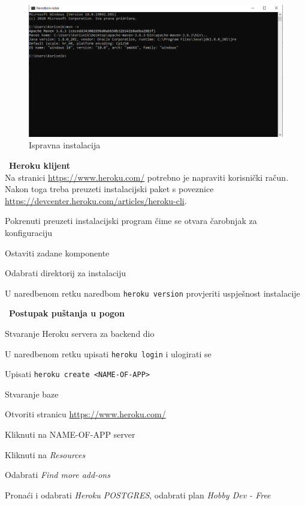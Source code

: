 			\begin{figure}[H]
				\includegraphics[scale=0.5]{slike/maven} %
				\centering
				\caption{Ispravna instalacija}
				\label{fig:mavenIspravnaInstalacija}
			\end{figure}
			\
			\textbf{Heroku klijent}
			\\Na stranici \href{https://www.heroku.com/}{https://www.heroku.com/} potrebno je napraviti korisnički račun. Nakon toga treba preuzeti instalacijski paket s poveznice \url{https://devcenter.heroku.com/articles/heroku-cli}.
				\begin{packed_enum}
					\item Pokrenuti preuzeti instalacijski program čime se otvara čarobnjak za konfiguraciju
					\item Ostaviti zadane komponente
					\item Odabrati direktorij za instalaciju
					\item U naredbenom retku naredbom \texttt{heroku version} provjeriti uspješnost instalacije
				\end{packed_enum}
			\
			\textbf{Postupak puštanja u pogon}
				\begin{packed_item}
					\item Stvaranje Heroku servera za backend dio
					\begin{packed_enum}
						\item U naredbenom retku upisati \texttt{heroku login} i ulogirati se
						\item Upisati \texttt{heroku create <NAME-OF-APP>}
					\end{packed_enum}
				\end{packed_item}
			
				\begin{packed_item}
					\item Stvaranje baze
					\begin{packed_enum}
						\item Otvoriti stranicu \href{https://www.heroku.com/}{https://www.heroku.com/} 
						\item Kliknuti na NAME-OF-APP server
						\item Kliknuti na \textit{Resources}
						\item Odabrati \textit{Find more add-ons}
						\item Pronaći i odabrati \textit{Heroku POSTGRES}, odabrati plan \textit{Hobby Dev - Free}
					\end{packed_enum}
				\end{packed_item}
			
